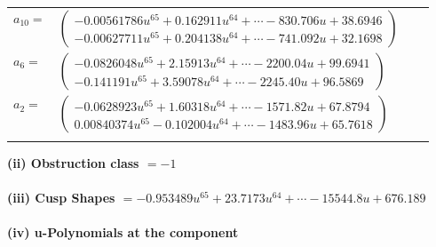 \documentclass[1p]{elsarticle_modified}
\theoremstyle{definition}
\begin{document}
\begin{tabular}{m{7pt} m{180pt} m{7pt} m{180pt} }
\flushright $a_{10}=$&$\begin{pmatrix}-0.00561786 u^{65}+0.162911 u^{64}+\cdots-830.706 u+38.6946\\-0.00627711 u^{65}+0.204138 u^{64}+\cdots-741.092 u+32.1698\end{pmatrix}$ \\
\flushright $a_{6}=$&$\begin{pmatrix}-0.0826048 u^{65}+2.15913 u^{64}+\cdots-2200.04 u+99.6941\\-0.141191 u^{65}+3.59078 u^{64}+\cdots-2245.40 u+96.5869\end{pmatrix}$ \\
\flushright $a_{2}=$&$\begin{pmatrix}-0.0628923 u^{65}+1.60318 u^{64}+\cdots-1571.82 u+67.8794\\0.00840374 u^{65}-0.102004 u^{64}+\cdots-1483.96 u+65.7618\end{pmatrix}$\\&\end{tabular}
\flushleft \textbf{(ii) Obstruction class $= -1$}\\~\\
\flushleft \textbf{(iii) Cusp Shapes $= -0.953489 u^{65}+23.7173 u^{64}+\cdots-15544.8 u+676.189$}\\~\\
\newpage\renewcommand{\arraystretch}{1}
\flushleft \textbf{(iv) u-Polynomials at the component}\newline \\
\end{document}
